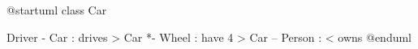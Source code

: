 \documentclass{scrartcl}
\begin{document}
\begin{plant-uml}
@startuml
class Car

Driver - Car : drives >
Car *- Wheel : have 4 >
Car -- Person : < owns
@enduml
\end{plant-uml}
\end{document}
